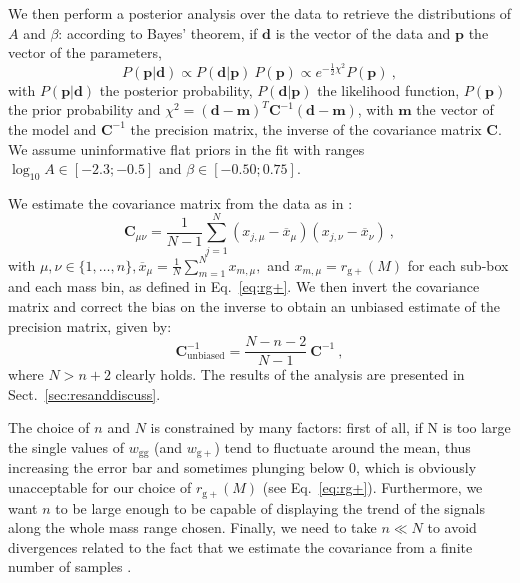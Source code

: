 \documentclass[a4paper,fleqn,usenatbib]{mnras}
\begin{document}
We then perform a posterior analysis over the data to retrieve the distributions of $A$ and $\beta$: according to Bayes' theorem, if $\boldsymbol{d}$ is the vector of the data and $\boldsymbol{p}$ the vector of the parameters, 
\begin{equation}
    P(\boldsymbol{p} | \boldsymbol{d}) \propto P(\boldsymbol{d} | \boldsymbol{p}) \ P(\boldsymbol{p}) \propto e^{-\frac{1}{2} \chi ^2} P(\boldsymbol{p}) \ ,
	\label{eq:bayes}
\end{equation}
with $P(\boldsymbol{p} | \boldsymbol{d})$ the posterior probability, $P(\boldsymbol{d} | \boldsymbol{p})$ the likelihood function, $P(\boldsymbol{p})$ the prior probability and $\chi ^2 = (\boldsymbol{d} - \boldsymbol{m})^T \mathbf{C}^{-1} (\boldsymbol{d} - \boldsymbol{m})$, with $\boldsymbol{m}$ the vector of the model and $\mathbf{C}^{-1}$ the precision matrix, the inverse of the covariance matrix $\mathbf{C}$. We assume uninformative flat priors in the fit with ranges $\log_{10} A \in [-2.3;-0.5]$ and $\beta \in [-0.50;0.75]$. 

We estimate the covariance matrix from the data as in \citet{Tayloretal2013}:
\begin{equation}
     \mathbf{C}_{\mu \nu} = \frac{1}{N-1} \sum_{j = 1}^{N} (x_{j, \mu} - \overline{x}_{\mu})(x_{j, \nu} - \overline{x}_{\nu}) \ ,
	\label{eq:covariance}
\end{equation}
with $\mu, \nu \in \{1, \dotso, n\}, \overline{x}_{\mu} = \frac{1}{N} \sum_{m=1}^{N} x_{m, \mu},$ and $x_{m, \mu}= r_{\mathrm{g+}}(M)$ for each sub-box and each mass bin, as defined in Eq.~\ref{eq:rg+}. We then invert the covariance matrix and correct the bias on the inverse to obtain an unbiased estimate of the precision matrix, given by:
\begin{equation}
     \mathbf{C}^{-1}_{\mathrm{unbiased}} = \frac{N - n -2}{N-1} \  \mathbf{C}^{-1} \ ,
	\label{eq:precunbiased}
\end{equation}
where $N > n+2$ clearly holds. The results of the analysis are presented in Sect.~\ref{sec:resanddiscuss}.

The choice of $n$ and $N$ is constrained by many factors: first of all, if N is too large the single values of $w_{\mathrm{gg}}$ (and $w_{\mathrm{g+}}$) tend to fluctuate around the mean, thus increasing the error bar and sometimes plunging below 0, which is obviously unacceptable for our choice of $ r_{\mathrm{g+}} (M)$ (see Eq.~\ref{eq:rg+}). Furthermore, we want $n$ to be large enough to be capable of displaying the trend of the signals along the whole mass range chosen. Finally, we need to take $n \ll N$ to avoid divergences related to the fact that we estimate the covariance from a finite number of samples \citep{Tayloretal2013}.
\end{document}
